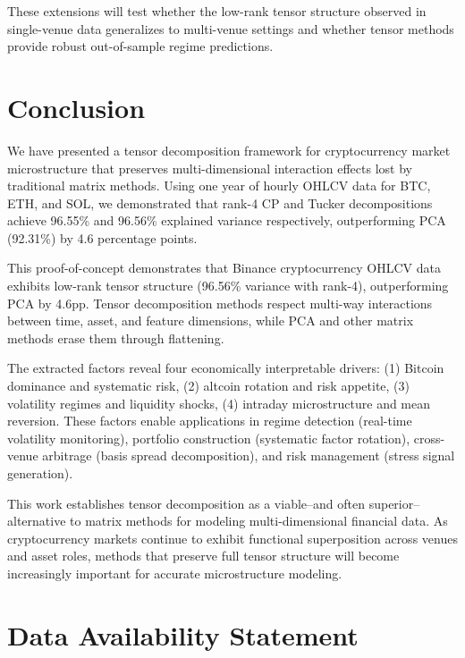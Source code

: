 \documentclass[11pt,twocolumn]{article}
\begin{document}
These extensions will test whether the low-rank tensor structure observed in single-venue data generalizes to multi-venue settings and whether tensor methods provide robust out-of-sample regime predictions.

\section{Conclusion}
\label{sec:conclusion}

We have presented a tensor decomposition framework for cryptocurrency market microstructure that preserves multi-dimensional interaction effects lost by traditional matrix methods. Using one year of hourly OHLCV data for BTC, ETH, and SOL, we demonstrated that rank-4 CP and Tucker decompositions achieve 96.55\% and 96.56\% explained variance respectively, outperforming PCA (92.31\%) by 4.6 percentage points.

This proof-of-concept demonstrates that Binance cryptocurrency OHLCV data exhibits low-rank tensor structure (96.56\% variance with rank-4), outperforming PCA by 4.6pp. Tensor decomposition methods respect multi-way interactions between time, asset, and feature dimensions, while PCA and other matrix methods erase them through flattening.

The extracted factors reveal four economically interpretable drivers: (1) Bitcoin dominance and systematic risk, (2) altcoin rotation and risk appetite, (3) volatility regimes and liquidity shocks, (4) intraday microstructure and mean reversion. These factors enable applications in regime detection (real-time volatility monitoring), portfolio construction (systematic factor rotation), cross-venue arbitrage (basis spread decomposition), and risk management (stress signal generation).

This work establishes tensor decomposition as a viable--and often superior--alternative to matrix methods for modeling multi-dimensional financial data. As cryptocurrency markets continue to exhibit functional superposition across venues and asset roles, methods that preserve full tensor structure will become increasingly important for accurate microstructure modeling.

\clearpage
\onecolumn
{}  %


\section*{Data Availability Statement}
\end{document}
